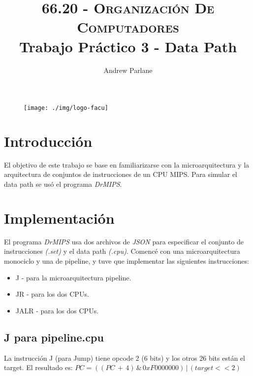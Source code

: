 \documentclass[a4paper]{article}
\begin{document}
\begin{figure}
\centering
\texttt{[image: ./img/logo-facu]}
\end{figure}

\title{\large\textsc{66.20 - Organización De Computadores}\\
\large Trabajo Práctico 3 - Data Path}

\author{
Andrew Parlane \\
}

\maketitle

\newpage

\tableofcontents

\listoffigures

\newpage

\section{Introducción}

El objetivo de este trabajo se base en familiarizarse con la microarquitectura y la arquitectura de conjuntos de instrucciones de un CPU MIPS. Para simular el data path se usó el programa \textit{DrMIPS}.

\section{Implementación}

El programa \textit{DrMIPS} usa dos archivos de \textit{JSON} para especificar el conjunto de instrucciones \textit{(.set)} y el data path \textit{(.cpu)}. Comencé con una microarquitectura monociclo y una de pipeline, y tuve que implementar las siguientes instrucciones:
\begin{itemize}[noitemsep]
\item J - para la microarquitectura pipeline.
\item JR - para los dos CPUs.
\item JALR - para los dos CPUs.
\end{itemize}

\subsection{J para pipeline.cpu}

La instrucción J (para Jump) tiene opcode 2 (6 bits) y los otros 26 bits están el target. El resultado es: $PC = ((PC\, +\, 4)\, \&\, 0xF0000000)\, |\, (target << 2)$
\end{document}

